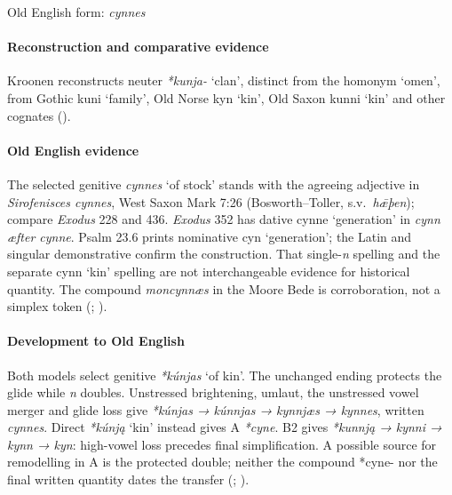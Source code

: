 \documentclass[
  british,
  a4paper,
]{article}
\providecommand{\Recon}[1]{\emph{*#1}}
\begin{document}
Old English form: \emph{cynnes}

\paragraph{Reconstruction and comparative
evidence}\label{reconstruction-and-comparative-evidence-41}

Kroonen reconstructs neuter \Recon{kunja-} `clan', distinct from the
homonym `omen', from Gothic {kuni} `family', Old Norse {kyn} `kin', Old
Saxon {kunni} `kin' and other cognates
().

\paragraph{Old English evidence}\label{old-english-evidence-42}

The selected genitive \emph{cynnes} `of stock' stands with the agreeing
adjective in \emph{Sirofenisces cynnes}, West Saxon Mark 7:26
(Bosworth--Toller, s.v.~\emph{hǣþen}); compare \emph{Exodus} 228 and
436. \emph{Exodus} 352 has dative {cynne} `generation' in \emph{cynn
æfter cynne}. Psalm 23.6 prints nominative {cyn} `generation'; the Latin
and singular demonstrative confirm the construction. That
single-\emph{n} spelling and the separate {cynn} `kin' spelling are not
interchangeable evidence for historical quantity. The compound
\emph{moncynnæs} in the Moore Bede is corroboration, not a simplex token
(;
).

\paragraph{Development to Old
English}\label{development-to-old-english-42}

Both models select genitive \Recon{kúnjas} `of kin'. The unchanged
ending protects the glide while \emph{n} doubles. Unstressed
brightening, umlaut, the unstressed vowel merger and glide loss give
\emph{*kúnjas → kúnnjas → kynnjæs → kynnes}, written \emph{cynnes}.
Direct \Recon{kúnją} `kin' instead gives A \emph{*cyne}. B2 gives
\emph{*kunnją → kynni → kynn → kyn}: high-vowel loss precedes final
simplification. A possible source for remodelling in A is the protected
double; neither the compound *cyne- nor the final written quantity dates
the transfer (; ).
\end{document}
